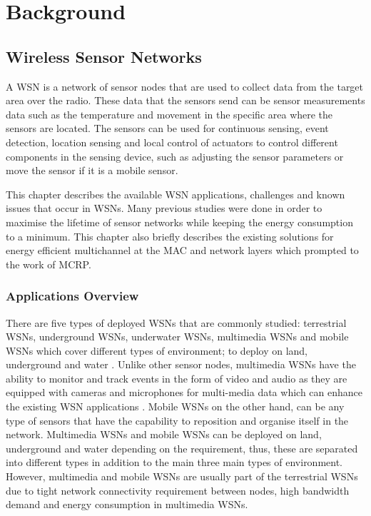 \chapter{Background}
\label{literatureReview}

\section{Wireless Sensor Networks}
A WSN is a network of sensor nodes that are used to collect data from the target area over the radio. These data that the sensors send can be sensor measurements data such as the temperature and movement in the specific area where the sensors are located. The sensors can be used for continuous sensing, event detection, location sensing and local control of actuators to control different components in the sensing device, such as adjusting the sensor parameters or move the sensor if it is a mobile sensor.

This chapter describes the available WSN applications, challenges and known issues that occur in WSNs. Many previous studies were done in order to maximise the lifetime of sensor networks while keeping the energy consumption to a minimum. This chapter also briefly describes the existing solutions for energy efficient multichannel at the MAC and network layers which prompted to the work of MCRP. 

\subsection{Applications Overview}
There are five types of deployed WSNs that are commonly studied: terrestrial WSNs, underground WSNs, underwater WSNs, multimedia WSNs and mobile WSNs which cover different types of environment; to deploy on land, underground and water \cite{wsnSurvey1}. Unlike other sensor nodes, multimedia WSNs have the ability to monitor and track events in the form of video and audio as they are equipped with cameras and microphones for multi-media data which can enhance the existing WSN applications \cite{wsnSurvey3}. Mobile WSNs on the other hand, can be any type of sensors that have the capability to reposition and organise itself in the network. Multimedia WSNs and mobile WSNs can be deployed on land, underground and water depending on the requirement, thus, these are separated into different types in addition to the main three main types of environment. However, multimedia and mobile WSNs are usually part of the terrestrial WSNs due to tight network connectivity requirement between nodes, high bandwidth demand and energy consumption in multimedia WSNs.  

